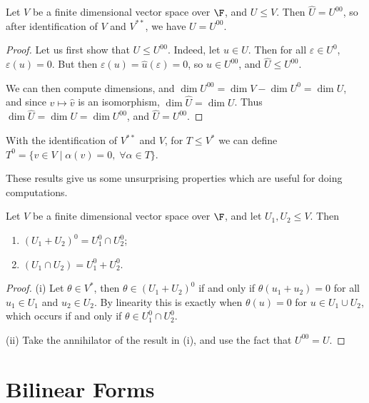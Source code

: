 \documentclass[a4paper]{scrartcl}
\begin{document}
\begin{lemma}
    Let $V$ be a finite dimensional vector space over $\F$, and $U \leq V$. Then
    $\hat{U} = U^{00}$, so after identification of $V$ and $V^{**}$, we have $U = U^{00}$.
\end{lemma}
\begin{proof}
    Let us first show that $U \leq U^{00}$. Indeed, let $u \in U$. Then for all $\varepsilon \in U^0$, $\varepsilon(u) = 0$. But then $\varepsilon(u) = \hat{u}(\varepsilon) = 0$, so $\hat{u} \in U^{00}$, and $\hat{U} \leq U^{00}$.
    
    We can then compute dimensions, and $\dim U^{00} = \dim V - \dim U^{0} = \dim U$, and since $v \mapsto \hat{v}$ is an isomorphism, $\dim \hat{U} = 
    \dim U$. Thus $\dim \hat{U} = \dim U = \dim U^{00}$, and $\hat{U} = U^{00}$.
\end{proof}

\begin{remark}
    With the identification of $V^{**}$ and $V$, for $T \leq V^{*}$ we can define $T^0 = \{v \in V \mid \alpha(v) = 0, \; \forall \alpha \in T\}$.
\end{remark}

These results give us some unsurprising properties which are useful for doing computations.

\begin{lemma}
    Let $V$ be a finite dimensional vector space over $\F$, and let $U_1, U_2 \leq V$. Then 
    \begin{enumerate}[label=(\roman*)]
        \item $(U_1 + U_2)^0 = U_1^0 \cap U_2^0$;
        \item $(U_1 \cap U_2) = U_1^0 + U_2^0$.
    \end{enumerate}
\end{lemma}
\begin{proof}
    (i) Let $\theta \in V^*$, then $\theta \in (U_1 + U_2)^0$ if and only if $\theta(u_1 + u_2) = 0$ for all $u_1 \in U_1$ and $u_2 \in U_2$. By linearity this is exactly when $\theta(u) = 0$ for $u \in U_1 \cup U_2$, which occurs if and only if $\theta \in U_1^0 \cap U_2^0$.

    (ii) Take the annihilator of the result in (i), and use the fact that $U^{00} = U$.
\end{proof}

\section{Bilinear Forms}
\end{document}
